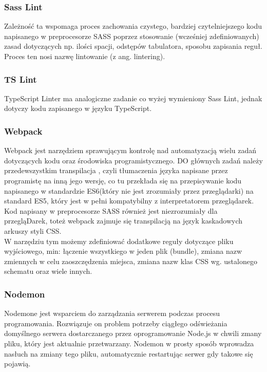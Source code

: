 \documentclass[eng,printmode]{mgr}
\begin{document}
\subsubsection{Sass Lint}
Zależność ta \cite {SASS_LINT} wspomaga proces zachowania czystego, bardziej czytelniejszego kodu napisanego w preprocesorze  SASS poprzez stosowanie (wcześniej zdefiniowanych) zasad dotyczących np. ilości spacji, odstępów tabulatora, sposobu zapisania reguł. Proces ten nosi nazwę lintowanie (z ang. lintering).

\subsubsection{TS Lint}
TypeScript Linter \cite {TS_LINT} ma analogiczne zadanie co wyżej wymieniony Sass Lint, jednak dotyczy kodu zapisanego w języku TypeScript.

\subsubsection{Webpack}
Webpack \cite {WEBPACK} jest narzędziem sprawującym kontrolę nad automatyzacją wielu zadań dotyczących kodu oraz środowiska programistycznego. DO głównych zadań należy przedewszystkim transpilacja \cite {TRANSPILE}, czyli tłumaczenia języka napisane przez programistę na inną jego wersję, co tu przekłada się na przepisywanie kodu napisanego w standardzie ES6(który nie jest zrozumiały przez przeglądarki) na standard ES5, który jest w pełni kompatybilny z interpretatorem przeglądarek. Kod napisany w preprocesorze SASS również jest niezrozumiały dla przegląDarek, toteż webpack zajmuje się transpilacją na język kaskadowych arkuszy styli CSS.
\\
W narzędziu tym możemy zdefiniować dodatkowe reguły dotyczące pliku wyjściowego, min: łączenie wszystkiego w jeden plik (bundle), zmiana nazw zmiennych w celu zaoszczędzenia miejsca, zmiana nazw klas CSS wg. ustalonego schematu oraz wiele innych.

\subsubsection{Nodemon}
Nodemone \cite {NODEMON} jest wsparciem do zarządzania serwerem podczas procesu programowania. Rozwiązuje on problem potrzeby ciągłego odświeżania domyślnego serwera dostarczanego przez oprogramowanie Node.js w chwili zmany pliku, który jest aktualnie przetwarzany. Nodemon w prosty sposób wprowadza nasłuch na zmiany tego pliku, automatycznie restartując serwer gdy takowe się pojawią.
\end{document}
